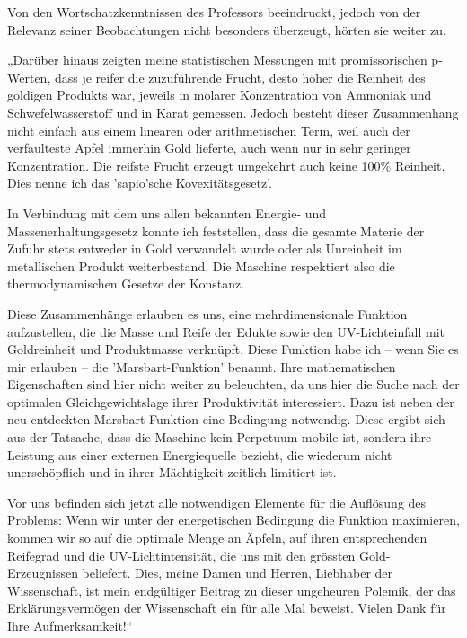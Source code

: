 Von den Wortschatzkenntnissen des Professors beeindruckt,
jedoch von der Relevanz seiner Beobachtungen nicht besonders
überzeugt, hörten sie weiter zu.

„Darüber hinaus zeigten meine statistischen Messungen mit
promissorischen p-Werten, dass je reifer die zuzuführende
Frucht, desto höher die Reinheit des goldigen Produkts war,
jeweils in molarer Konzentration von Ammoniak und
Schwefelwasserstoff und in Karat gemessen. Jedoch besteht
dieser Zusammenhang nicht einfach aus einem linearen oder
arithmetischen Term, weil auch der verfaulteste Apfel immerhin
Gold lieferte, auch wenn nur in sehr geringer Konzentration.
Die reifste Frucht erzeugt umgekehrt auch keine 100\% Reinheit.
Dies nenne ich das 'sapio'sche Kovexitätsgesetz'.

In Verbindung mit dem uns allen bekannten Energie- und
Massenerhaltungsgesetz konnte ich feststellen, dass die gesamte
Materie der Zufuhr stets entweder in Gold verwandelt wurde oder
als Unreinheit im metallischen Produkt weiterbestand. Die
Maschine respektiert also die thermodynamischen Gesetze der
Konstanz.

Diese Zusammenhänge erlauben es uns, eine mehrdimensionale
Funktion aufzustellen, die die Masse und Reife der Edukte sowie
den UV-Lichteinfall mit Goldreinheit und Produktmasse
verknüpft.  Diese Funktion habe ich – wenn Sie es mir erlauben
– die 'Marsbart-Funktion' benannt. Ihre mathematischen
Eigenschaften sind hier nicht weiter zu beleuchten, da uns hier
die Suche nach der optimalen Gleichgewichtslage ihrer
Produktivität interessiert. Dazu ist neben der neu entdeckten
Marsbart-Funktion eine Bedingung notwendig. Diese ergibt sich
aus der Tatsache, dass die Maschine kein Perpetuum mobile ist,
sondern ihre Leistung aus einer externen Energiequelle bezieht,
die wiederum nicht unerschöpflich und in ihrer Mächtigkeit
zeitlich limitiert ist.

Vor uns befinden sich jetzt alle notwendigen Elemente für die
Auflösung des Problems: Wenn wir unter der energetischen
Bedingung die Funktion maximieren, kommen wir so auf die
optimale Menge an Äpfeln, auf ihren entsprechenden Reifegrad
und die UV-Lichtintensität, die uns mit den grössten
Gold-Erzeugnissen beliefert. Dies, meine Damen und Herren,
Liebhaber der Wissenschaft, ist mein endgültiger Beitrag zu
dieser ungeheuren Polemik, der das Erklärungsvermögen der
Wissenschaft ein für alle Mal beweist. Vielen Dank für Ihre
Aufmerksamkeit!“

